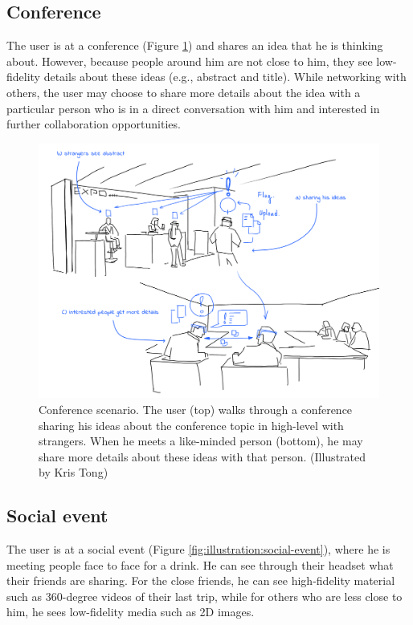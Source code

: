 \pagebreak
\subsection{Conference}

The user is at a conference (Figure \ref{fig:illustration:conference}) and shares an idea that he is thinking about. However, because people around him are not close to him, they see low-fidelity details about these ideas (e.g., abstract and title). While networking with others, the user may choose to share more details about the idea with a particular person who is in a direct conversation with him and interested in further collaboration opportunities.

\begin{figure}[ht]
    \centering
    \includegraphics[width=\linewidth]{images/30-continuum/illustrations/4_Flag_On_Conference.png}
    \caption{Conference scenario. The user (top) walks through a conference sharing his ideas about the conference topic in high-level with strangers. When he meets a like-minded person (bottom), he may share more details about these ideas with that person. (Illustrated by Kris Tong)}
    \label{fig:illustration:conference}
\end{figure}

\pagebreak
\subsection{Social event}

The user is at a social event (Figure \ref{fig:illustration:social-event}), where he is meeting people face to face for a drink. He can see through their headset what their friends are sharing. For the close friends, he can see high-fidelity material such as 360-degree videos of their last trip, while for others who are less close to him, he sees low-fidelity media such as 2D images. 

